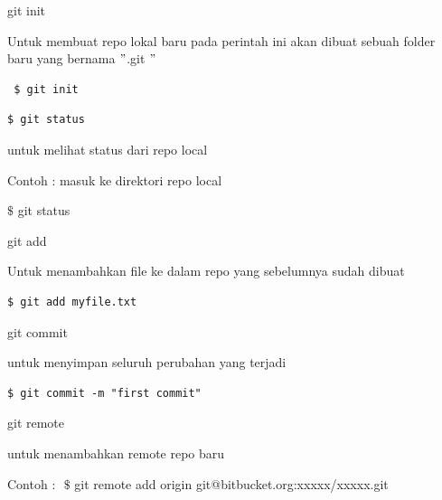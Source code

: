 \noindent 
git init $  $ \par
\noindent 
\vspace{\baselineskip}
Untuk membuat repo lokal baru pada perintah ini akan dibuat sebuah folder baru yang bernama  $ " $.git $ " $ \par
\noindent 
\vspace{\baselineskip}
\begin{verbatim}
 $ git init
\end{verbatim}
\begin{verbatim}
$ git status
\end{verbatim}
\vspace{\baselineskip}
untuk melihat status dari repo local \par
\noindent 
\vspace{\baselineskip}
Contoh : masuk ke direktori repo local \par
\noindent 
\vspace{\baselineskip}
 $  \$  $ git status \par
\vspace{12pt}
\noindent 
git add $  $ \par
\noindent 
\vspace{\baselineskip}
Untuk menambahkan file ke dalam repo yang sebelumnya sudah dibuat \par
\noindent 
\vspace{\baselineskip}
\begin{verbatim}
$ git add myfile.txt
\end{verbatim}
\vspace{12pt}
\noindent 
git commit \par
\noindent 
\vspace{\baselineskip}
untuk menyimpan seluruh perubahan yang terjadi \par
\noindent 
\vspace{\baselineskip}
\begin{verbatim}
$ git commit -m "first commit"
\end{verbatim}\vspace{12pt}
\noindent 
git remote $  $ \par
\noindent 
\vspace{\baselineskip}
untuk menambahkan remote repo baru \par
\noindent 
\vspace{\baselineskip}
Contoh : $  $ $  \$  $ git remote add origin git@bitbucket.org:xxxxx/xxxxx.git \par
\vspace{12pt}

